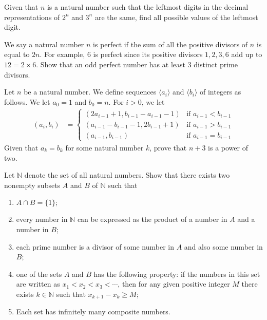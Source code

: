 \begin{problem}
	Given that $n$ is a natural number such that the leftmost digits in the decimal representations of $2^n$ and $3^n$ are the same, find all possible values of the leftmost digit. %
\end{problem}

\begin{problem}
	We say a natural number $n$ is perfect if the sum of all the positive divisors of $n$ is equal to $2n$. For example, $6$ is perfect since its positive divisors $1,2,3,6$ add up to $12=2\times 6$. Show that an odd perfect number has at least $3$ distinct prime divisors. %
\end{problem}

\begin{problem}
	Let $n$ be a natural number. We define sequences $\langle a_i\rangle$ and $\langle b_i\rangle$ of integers as follows. We let $a_0=1$ and $b_0=n$. For $i>0$, we let
		\begin{align*}
			(a_i,b_i)
				& =
				\begin{cases}
					\left(2a_{i-1}+1,b_{i-1}-a_{i-1}-1\right) & \text{if } a_{i-1}<b_{i-1}\\
					\left( a_{i-1}-b_{i-1}-1,2b_{i-1}+1\right) & \text{if } a_{i-1}>b_{i-1}\\
					\left(a_{i-1},b_{i-1}\right) & \text{if } a_{i-1}=b_{i-1}
				\end{cases}
		\end{align*}
	Given that $a_k=b_k$ for some natural number $k$, prove that $n+3$ is a power of two. %
\end{problem}

\begin{problem}
	Let $\mathbb N$ denote the set of all natural numbers. Show that there exists two nonempty subsets $A$ and $B$ of $\mathbb N$ such that
	\begin{enumerate}
		\item $A\cap B=\{1\};$
		\item every number in $\mathbb N$ can be expressed as the product of a number in $A$ and a number in $B$;
		\item each prime number is a divisor of some number in $A$ and also some number in $B$;
		\item one of the sets $A$ and $B$ has the following property: if the numbers in this set are written as $x_1<x_2<x_3<\cdots$, then for any given positive integer $M$ there exists $k\in \mathbb N$ such that $x_{k+1}-x_k\ge M$;
		\item Each set has infinitely many composite numbers.
	\end{enumerate}
\end{problem}


